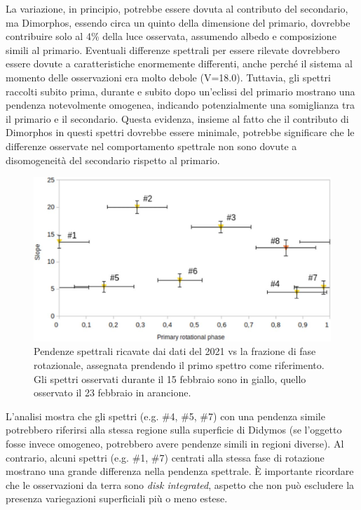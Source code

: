 \documentclass[a4paper,11pt,openright]{book}
\begin{document}
La variazione, in principio, potrebbe essere dovuta al contributo del secondario, ma Dimorphos, essendo circa un quinto della dimensione del primario, dovrebbe contribuire solo al 4\% della luce osservata, assumendo albedo e composizione simili al primario. Eventuali differenze spettrali per essere rilevate dovrebbero essere dovute a caratteristiche enormemente differenti, anche perché il sistema al momento delle osservazioni era molto debole (V=18.0). Tuttavia, gli spettri raccolti subito prima, durante e subito dopo un'eclissi del primario mostrano una pendenza notevolmente omogenea, indicando potenzialmente una somiglianza tra il primario e il secondario. Questa evidenza, insieme al fatto che il contributo di Dimorphos in questi spettri dovrebbe essere minimale, potrebbe significare che le differenze osservate nel comportamento spettrale non sono dovute a disomogeneità del secondario rispetto al primario.

\begin{figure}[!h]
    \centering
    \includegraphics[scale=0.7]{figure/slope_ieva.jpg}
    \caption[Pendenze spettrali dei dati del 2021.]{Pendenze spettrali ricavate dai dati del 2021 vs la frazione di fase rotazionale, assegnata prendendo il primo spettro come riferimento. Gli spettri osservati durante il 15 febbraio sono in giallo, quello osservato il 23 febbraio in arancione. \citep{ieva_spectral_2022}}
    \label{fig:slope_ieva}
\end{figure}

L'analisi mostra che gli spettri (e.g. \#4, \#5, \#7) con una pendenza simile potrebbero riferirsi alla stessa regione sulla superficie di Didymos (se l'oggetto fosse invece omogeneo, potrebbero avere pendenze simili in regioni diverse). Al contrario, alcuni spettri (e.g. \#1, \#7) centrati alla stessa fase di rotazione mostrano una grande differenza nella pendenza spettrale. È importante ricordare che le osservazioni da terra sono \textit{disk integrated}, aspetto che non può escludere la presenza variegazioni superficiali più o meno estese.
\end{document}
